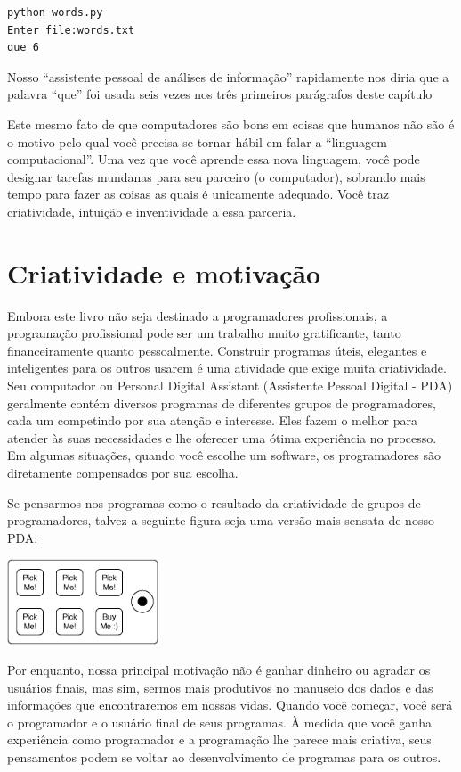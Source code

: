 \begin{verbatim}
python words.py
Enter file:words.txt
que 6
\end{verbatim}

Nosso ``assistente pessoal de análises de informação'' rapidamente nos diria que a palavra ``que'' foi usada seis vezes nos três primeiros parágrafos deste capítulo

Este mesmo fato de que computadores são bons em coisas que humanos não são é o motivo pelo qual você precisa se tornar hábil em falar a ``linguagem computacional''. Uma vez que você aprende essa nova linguagem, você pode designar tarefas mundanas para seu parceiro (o computador), sobrando mais tempo para fazer as coisas as quais é unicamente adequado. Você traz criatividade, intuição e inventividade a essa parceria.  
\section{Criatividade e motivação} %

Embora este livro não seja destinado a programadores profissionais, a programação profissional pode ser um trabalho muito gratificante, tanto financeiramente quanto pessoalmente. Construir programas úteis, elegantes e inteligentes para os outros usarem é uma atividade que exige muita criatividade. Seu computador ou Personal Digital Assistant (Assistente Pessoal Digital - PDA) geralmente contém diversos programas de diferentes grupos de programadores, cada um competindo por sua atenção e interesse. Eles fazem o melhor para atender às suas necessidades e lhe oferecer uma ótima experiência no processo. Em algumas situações, quando você escolhe um software, os programadores são diretamente compensados por sua escolha.

Se pensarmos nos programas como 
o resultado da criatividade de grupos de programadores, talvez a seguinte figura seja uma versão mais sensata de nosso PDA:


\centerline{\includegraphics[height=1.00in]{figs2/pda2.eps}}


Por enquanto, nossa principal motivação não é ganhar dinheiro ou agradar os usuários finais, mas sim, sermos mais produtivos no manuseio dos dados e das informações que encontraremos em nossas vidas. Quando você começar, você será o programador e o usuário final de seus programas. À medida que você ganha experiência como programador e a programação lhe parece mais criativa, seus pensamentos podem se voltar ao desenvolvimento de programas para os outros.

